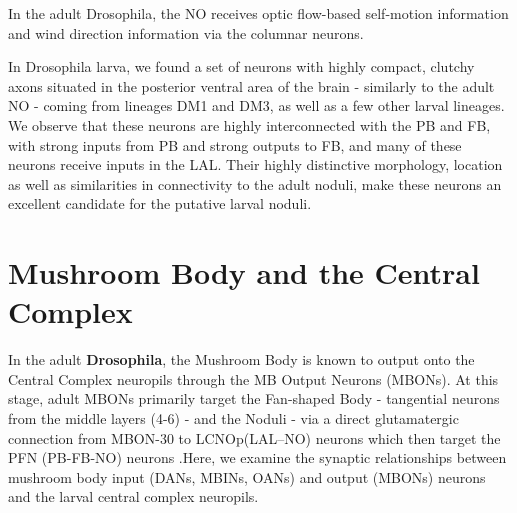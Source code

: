     In the adult Drosophila, the NO receives optic flow-based self-motion information and wind direction information via the columnar neurons. %

    In Drosophila larva, we found a set of neurons with highly compact, clutchy axons situated in the posterior ventral area of the brain - similarly to the adult NO - coming from lineages DM1 and DM3, as well as a few other larval lineages. We observe that these neurons are highly interconnected with the PB and FB,  with strong inputs from 
    PB and strong outputs to FB, and many of these neurons receive inputs in the LAL.
    Their highly distinctive morphology, location as well as similarities in connectivity to the adult noduli, make these neurons an excellent candidate for the putative larval noduli.




\section{Mushroom Body and the Central Complex}
    In the adult \textbf{Drosophila}, the Mushroom Body is known to output onto the Central Complex neuropils through the MB Output Neurons (MBONs). At this stage, adult MBONs primarily target the Fan-shaped Body - tangential neurons from the middle layers (4-6) - and the Noduli - via a direct glutamatergic connection from MBON-30 to LCNOp(LAL–NO) neurons which then target the PFN (PB-FB-NO) neurons \citep{hulse2021connectome}.Here, we examine the synaptic relationships between mushroom body input (DANs, MBINs, OANs) and output (MBONs) neurons and the larval central complex neuropils. 
        
